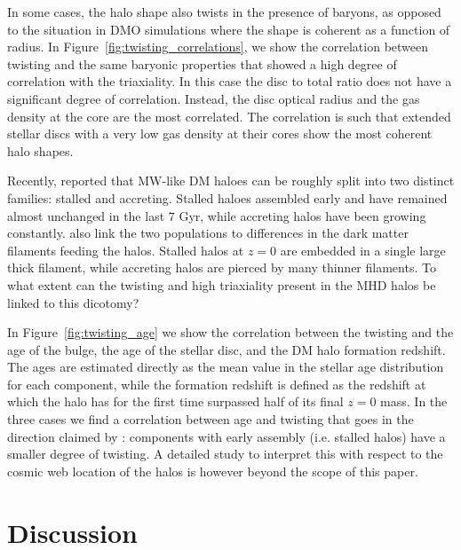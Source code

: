 \documentclass[usenatbib]{mnras}
\begin{document}
In some cases, the halo shape also twists in the presence of baryons, as opposed to
the situation in DMO simulations where the shape is coherent as a
function of radius. In Figure~\ref{fig:twisting_correlations}, we show the correlation
between twisting and the same baryonic properties that showed a high
degree of correlation with the triaxiality.
In this case the disc to total ratio does not have a significant
degree of correlation. Instead, the disc optical radius and the gas density
at the core are the most correlated. 
The correlation is such that extended stellar discs with a very low
gas density at their cores show the most coherent halo shapes.  

Recently, \citet{2017MNRAS.469..594B} reported that MW-like DM haloes can
be roughly split into two distinct families: stalled and accreting.
Stalled haloes assembled early and have remained almost unchanged
in the last $7$ Gyr, while accreting halos have been growing
constantly. \citet{2017MNRAS.469..594B} also link the two populations to
differences in the dark matter filaments feeding the halos. 
Stalled halos at $z=0$ are embedded in a single large thick filament, while
accreting halos are pierced by many thinner filaments. 
To what extent can the twisting and high triaxiality present in the MHD
halos be linked to this dicotomy?

In Figure~\ref{fig:twisting_age} we show the correlation between the
twisting and the age of the bulge, the age of the stellar disc, and the
DM halo formation redshift. The ages are estimated directly as the mean 
value in the stellar age distribution for each component, while the formation redshift is
defined as the redshift at which the halo has for the first time surpassed half of its final $z=0$
mass. In the three cases we find a correlation between age and twisting
that goes in the direction claimed by \citet{2017MNRAS.469..594B}:
components with early assembly (i.e. stalled halos) have a smaller degree of
twisting. A detailed study to interpret this with respect to the cosmic 
web location of the halos is however beyond the scope of this paper.

\section{Discussion}
\label{sec:discussion}
\end{document}
